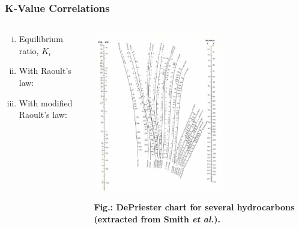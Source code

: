\documentclass[10pt,compress,unknownkeysallowed]{beamer}
\begin{document}
\begin{frame}
  \frametitle{K-Value Correlations}
  \begin{columns}
     \begin{column}[l]{0.5\linewidth}
        \begin{enumerate}[i)]
           \item<1-> Equilibrium ratio, $K_{i}$
           \item<2-> With Raoult's law:
           \item<3-> With modified Raoult's law:
        \end{enumerate}
     \end{column}
     \begin{column}[l]{0.5\linewidth}
        \begin{center}
          \hspace{-.8cm}\includegraphics[width=5.7cm,clip]{./../Pics/02_07_fig_02.png}
          
          \tiny{\bf{Fig.:} DePriester chart for several hydrocarbons (extracted from Smith {\it et al.}).}
        \end{center}
     \end{column}
   \end{columns}
\end{frame}
\end{document}
